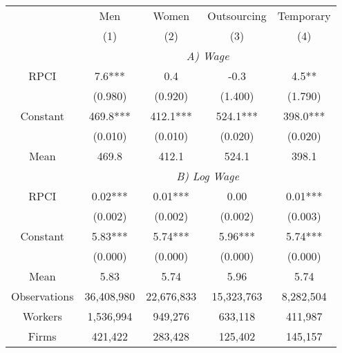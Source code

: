 \begin{tabular}{ccccc}
\toprule
\toprule
      & Men   & Women & Outsourcing & Temporary \\
      & (1)   & (2)   & (3)   & (4) \\
\cmidrule{2-5}      & \multicolumn{4}{c}{\textit{A) Wage}} \\
\midrule
RPCI  & 7.6*** & 0.4   & -0.3  & 4.5** \\
      & (0.980) & (0.920) & (1.400) & (1.790) \\
Constant & 469.8*** & 412.1*** & 524.1*** & 398.0*** \\
      & (0.010) & (0.010) & (0.020) & (0.020) \\
Mean  & 469.8 & 412.1 & 524.1 & 398.1 \\
\cmidrule{2-5}      & \multicolumn{4}{c}{\textit{B) Log Wage}} \\
\midrule
RPCI  & 0.02*** & 0.01*** & 0.00  & 0.01*** \\
      & (0.002) & (0.002) & (0.002) & (0.003) \\
Constant & 5.83*** & 5.74*** & 5.96*** & 5.74*** \\
      & (0.000) & (0.000) & (0.000) & (0.000) \\
Mean  & 5.83  & 5.74  & 5.96  & 5.74 \\
\midrule
Observations & 36,408,980 & 22,676,833 & 15,323,763 & 8,282,504 \\
Workers & 1,536,994 & 949,276 & 633,118 & 411,987 \\
Firms & 421,422 & 283,428 & 125,402 & 145,157 \\
\bottomrule
\bottomrule
\end{tabular}%
